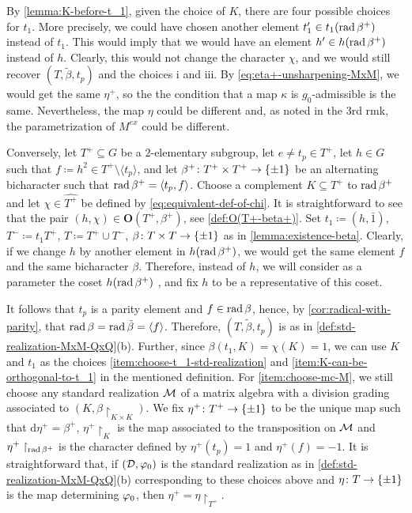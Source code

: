\begin{remark}
    By \cref{lemma:K-before-t_1}, given the choice of $K$, there are four possible choices for $t_1$. 
    More precisely, we could have chosen another element $t_1' \in t_1 (\operatorname{rad} \beta^+)$ instead of $t_1$. 
    This would imply that we would have an element $h' \in h (\operatorname{rad} \beta^+)$ instead of $h$. 
    Clearly, this would not change the character $\chi$, and we would still recover $(T, \tilde\beta, t_p)$ and the choices i and iii. 
    By \cref{eq:eta+-unsharpening-MxM}, we would get the same $\eta^+$, so the the condition that a map $\kappa$ is $g_0$-admissible is the same. 
    Nevertheless, the map $\eta$ could be different and, as noted in the 3rd rmk, the parametrization of $M^{ex}$ could be different. 
\end{remark}


Conversely, let $T^+ \subseteq G$ be a $2$-elementary subgroup, let $e\neq t_p \in T^+$, let $h\in G$ such that $f \coloneqq h^2 \in T^+ \setminus \langle t_p \rangle$, and let $\beta^+\colon T^+ \times T^+ \to \{ \pm 1 \}$ be an alternating bicharacter such that $\operatorname{rad} \beta^+ = \langle t_p, f \rangle$. 
Choose a complement $K \subseteq T^+$ to $\operatorname{rad} \beta^+$ and let $\chi \in \widehat{T^+}$ be defined by \cref{eq:equivalent-def-of-chi}. 
It is straightforward to see that the pair $(h, \chi) \in \mathbf{O} (T^+, \beta^+)$, see \cref{def:O(T+-beta+)}. 
Set $t_1 \coloneqq (h, \bar 1)$, $T^- \coloneqq t_1 T^+$, $T \coloneqq T^+ \cup T^-$, $\beta\colon T\times T\to \{ \pm 1 \}$ as in \cref{lemma:existence-beta}. 
Clearly, if we change $h$ by another element in $h (\operatorname{rad} \beta^+)$, we would get the same element $f$ and the same bicharacter $\beta$. 
Therefore, instead of $h$, we will consider as a parameter the coset $h(\operatorname{rad} \beta^+)$
, and fix $h$ to be a representative of this coset. 

It follows that $t_p$ is a parity element and $f\in \operatorname{rad} \beta$, hence, by \cref{cor:radical-with-parity}, that $\operatorname{rad} \beta = \operatorname{rad} \tilde\beta = \langle f \rangle$. 
Therefore, $(T, \tilde\beta, t_p)$ is as in \cref{def:std-realization-MxM-QxQ}(b). 
Further, since $\beta(t_1, K) = \chi(K) = 1$, we can use $K$ and $t_1$ as the choices \eqref{item:choose-t_1-std-realization} and \eqref{item:K-can-be-orthogonal-to-t_1} in the mentioned definition. 
For \eqref{item:choose-mc-M}, we still choose any standard realization $\mathcal M$ of a matrix algebra with a division grading associated to $(K, \beta\restriction_{K\times K})$. 
We fix $\eta^+\colon T^+ \to \{ \pm 1 \}$ to be the unique map such that $\mathrm{d}\eta^+ = \beta^+$,  $\eta^+\restriction_{K}$ is the map associated to the transposition on $\mathcal M$ and $\eta^+\restriction_{\operatorname{rad} \beta^+}$ is the character defined by $\eta^+(t_p) = 1$ and $\eta^+(f) = -1$. 
It is straightforward that, if $(\mathcal{D}, \varphi_0)$ is the standard realization as in \cref{def:std-realization-MxM-QxQ}(b) corresponding to these choices above and $\eta\colon T \to \{ \pm 1 \}$ is the map determining $\varphi_0$, then $\eta^+ = \eta\restriction_{T^+}$. 



